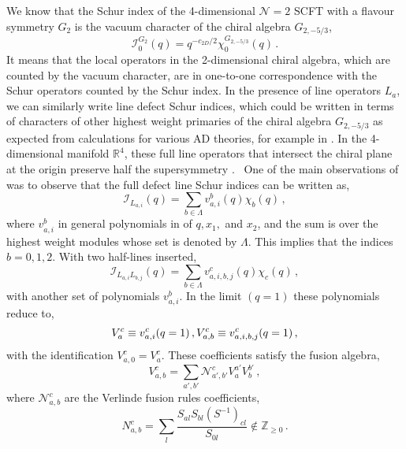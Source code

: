 \documentclass[a4paper,12pt]{article}
\begin{document}
We know that the Schur index of the 4-dimensional $\mathcal{N}=2$ SCFT with a flavour symmetry $G_2$ is the vacuum character of the chiral algebra $G_{2,-5/3}$,
\begin{equation}
    \mathcal{I}_{0}^{G_2}(q)=q^{-c_{2D}/2}\chi_{0}^{G_{2,-5/3}}(q)\, .
\end{equation}
It means that the local operators in the 2-dimensional chiral algebra, which are counted by the vacuum character, are in one-to-one correspondence with the Schur operators counted by the Schur index. In the presence of line operators $L_{a}$, we can similarly write line defect Schur indices, which could be written in terms of characters of other highest weight primaries of the chiral algebra $G_{2,-5/3}$ as expected from calculations for various AD theories, for example in \cite{Cordova:2016uwk}. In the 4-dimensional manifold $\mathbb{R}^{4}$, these full line operators that intersect the chiral plane \cite{Beem:2013sza} at the origin preserve half the supersymmetry \cite{Gaiotto:2010be, Cordova:2016uwk}. 
One of the main observations of \cite{Cordova:2016uwk} was to observe that the full defect line Schur indices can be written as, 
\begin{equation}\label{schur_index_characters}
    \mathcal{I}_{L_{a,i}}(q)=\sum_{b\in \Lambda} v_{a,i}^{b}(q)\chi_b(q)\, ,
\end{equation}
where $v_{a,i}^{b}$ in general polynomials in of $q,x_1,$ and $x_2$, and the sum is over the highest weight modules whose set is denoted by $\Lambda$. This implies that the indices $b=0,1,2$. With two half-lines inserted,
\begin{equation}
    \mathcal{I}_{L_{a,i}L_{b,j}}(q)=\sum_{b\in \Lambda} v_{a,i,b,j}^{c}(q)\chi_c(q)\, ,
\end{equation}
with another set of polynomials $v_{a,i}^{b}$. In the limit $(q=1)$ these polynomials reduce to,
\begin{equation}
    V_{a}^{c}\equiv v_{a,i}^{c}(q=1)\, ,\nonumber\\
    V_{a,b}^{c}\equiv v_{a,i,b,j}^{c}(q=1)\, ,
\end{equation}
 with the identification $V_{a,0}^{c}=V_a^c$. These coefficients satisfy the fusion algebra,
 \begin{equation}
     V_{a,b}^c=\sum_{a',b'}\mathcal{N}_{a',b'}^{c}V_{a}^{a'}V_{b}^{b'}\, ,
 \end{equation}
where $\mathcal{N}_{a,b}^{c}$ are the Verlinde fusion rules coefficients, 
\begin{equation}
	N_{a,b}^c=\sum_l\frac{S_{al}S_{bl}(S^{-1})_{cl}}{S_{0l}}\notin\mathbb{Z}_{\geq 0}\, .
\end{equation}
\end{document}
